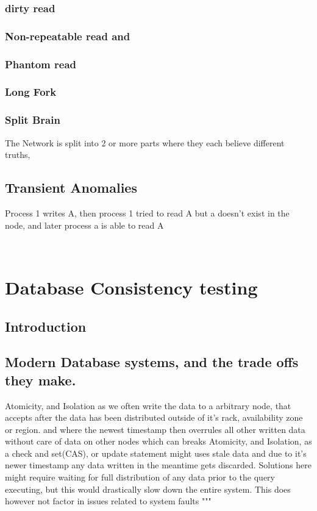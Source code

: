\documentclass[a4paper,10pt,titlepage]{report}
\begin{document}
\subsubsection{dirty read}
\subsubsection{Non-repeatable read and}
\subsubsection{Phantom read}

\subsubsection{Long Fork}

\subsubsection{Split Brain}

The Network is split into 2 or more parts where they each believe different truths,


\subsection{Transient Anomalies}

Process 1 writes A, then process 1 tried to read A but a doesn't exist in the node, and later process a is able to read A

\


\section{Database Consistency testing}



\subsection{Introduction}


\subsection{Modern Database systems, and the trade offs they make.}


Atomicity, and Isolation as we often write the data to a arbitrary node, that accepts after the data has been distributed outside of it's rack, availability zone or region. and where the newest timestamp then overrules all other written data without care of data on other nodes which can breaks Atomicity, and Isolation, as a check and set(CAS), or update statement might uses stale data and due to it's newer timestamp any data written in the meantime gets discarded. Solutions here might require waiting for full distribution of any data prior to the query executing, but this would drastically slow down the entire system. This does however not factor in issues related to system faults
"""
\end{document}
